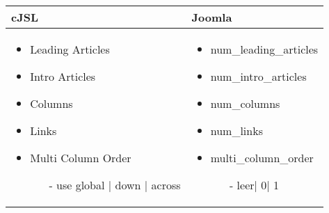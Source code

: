 \begin{minipage}{0.6\textwidth}
\begin{tabular}{|p{}|p{}|}
\hline
\textbf{cJSL} & \textbf{Joomla} \\ 
\hline
\begin{itemize}
	\item Leading Articles 
	\item Intro Articles
	\item Columns
	\item  Links
	\item Multi Column Order
	\begin{enumerate}
	  	\item[-] use global | down | across
	\end{enumerate} 
\end{itemize}
 & 
\begin{itemize}
	\item num\_leading\_articles 
	\item num\_intro\_articles 
	\item num\_columns 
	\item num\_links 
	\item multi\_column\_order
	\begin{enumerate}
		\item[-] leer| 0| 1
	\end{enumerate} 
\end{itemize}
\\
\hline
\end{tabular}
\end{minipage}

